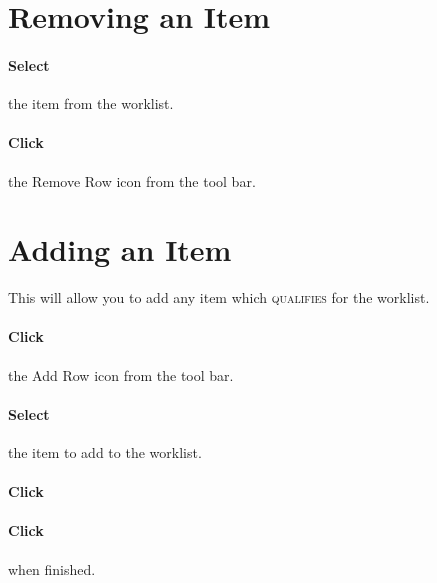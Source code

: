 
\section{Removing an Item}

\paragraph{Select} the item from the worklist.\\


\paragraph{Click} the Remove Row  icon from the tool bar.\\


\section{Adding an Item}

This will allow you to add any item which \textsc{qualifies} for the worklist.

\paragraph{Click} the Add Row  icon from the tool bar.\\


\paragraph{Select} the item to add to the worklist.

\paragraph{Click} 

\paragraph{Click}  when finished.\\

